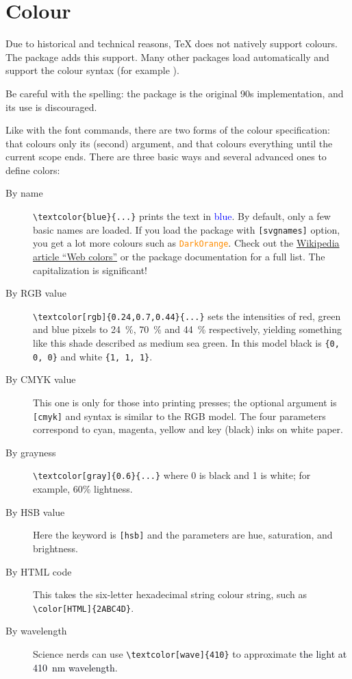%
%
%
\section{Colour}\label{sec:colour}

Due to historical and technical reasons, \TeX{} does not natively support colours.
The  package adds this support.
Many other packages load  automatically
and support the colour syntax (for example ).

\begin{gotcha}
Be careful with the spelling: the  package is the original 90s implementation,
and its use is discouraged.
\end{gotcha}

Like with the font commands, there are two forms of the colour specification:
 that colours only its (second) argument,
and  that colours everything until the current scope ends.
There are three basic ways and several advanced ones to define colors:

\begin{description}
\item[By name] \verb|\textcolor{blue}{...}| prints the text in \textcolor{blue}{blue}.
    By default, only a few basic names are loaded.
    If you load the package with \verb|[svgnames]| option,
    you get a lot more colours such as \textcolor{DarkOrange}{\texttt{DarkOrange}}.
    Check out the \href{https://en.wikipedia.org/wiki/Web_colors}{Wikipedia article ``Web colors''}
    or the package documentation for a full list.
    The capitalization is significant!
\item[By RGB value] \verb|\textcolor[rgb]{0.24,0.7,0.44}{...}|
    sets the intensities of red, green and blue pixels to 24~\%, 70~\% and 44~\% respectively,
    yielding something like \textcolor[rgb]{0.24,0.7,0.44}{this shade described as medium sea green}.
    In this model black is \verb|{0, 0, 0}| and white \verb|{1, 1, 1}|.
\item[By CMYK value] This one is only for those into printing presses;
    the optional argument is \verb|[cmyk]| and syntax is similar to the RGB model.
    The four parameters correspond to cyan, magenta, yellow and key (black) inks on white paper.
\item[By grayness] \verb|\textcolor[gray]{0.6}{...}|
    where 0 is black and 1 is white;
    \textcolor[gray]{0.6}{for example, 60\% lightness}.
\item[By HSB value] Here the keyword is \verb|[hsb]|
    and the parameters are hue, saturation, and brightness.
\item[By HTML code] This takes the six-letter hexadecimal string colour string,
    such as {\color[HTML]{2ABC4D} \verb|\color[HTML]{2ABC4D}|}.
\item[By wavelength]
    Science nerds can use \verb|\textcolor[wave]{410}|
    to approximate \textcolor[wave]{410}{the light at 410~nm wavelength}.
\end{description}

